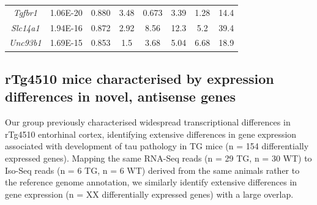 \begin{table}[!htp]
\begin{tabularx}{0.96\textwidth}{cccccccc}
		\textit{Tgfbr1}       & 1.06E-20             & 0.880              & 3.48                                                                                       & 0.673         & 3.39         & 1.28           & 14.4          \\
		\textit{Slc14a1}      & 1.94E-16             & 0.872              & 2.92                                                                                       & 8.56          & 12.3         & 5.2            & 39.4          \\
		\textit{Unc93b1}      & 1.69E-15             & 0.853              & 1.5                                                                                        & 3.68          & 5.04         & 6.68           & 18.9          \\ \bottomrule
	\end{tabularx}
	\label{tab:dea_wholemouse}
\end{table}

\subsection{rTg4510 mice characterised by expression differences in novel, antisense genes}
Our group previously characterised widespread transcriptional differences in rTg4510 entorhinal cortex, identifying extensive differences in gene expression associated with development of tau pathology in TG mice (n = 154 differentially expressed genes)\cite{Castanho2020}. Mapping the same RNA-Seq reads (n = 29 TG, n = 30 WT) to Iso-Seq reads (n = 6 TG, n = 6 WT) derived from the same animals rather to the reference genome annotation, we similarly identify extensive differences in gene expression (n = XX differentially expressed genes) with a large overlap. 


